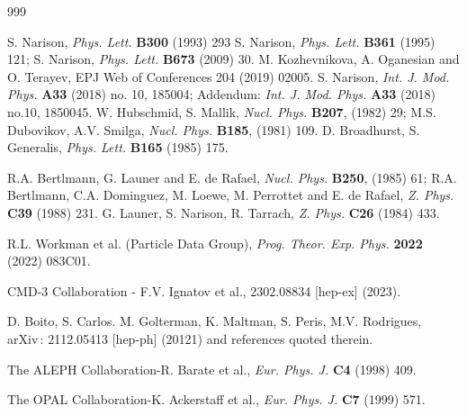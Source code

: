 \begin{thebibliography}{999}

S. Narison, {\it Phys. Lett.}  {\bf B300} (1993) 293
S. Narison, {\it Phys. Lett.}  {\bf B361} (1995) 121;
S. Narison, {\it Phys. Lett.} {\bf B673} (2009) 30.
 M. Kozhevnikova, A. Oganesian and O. Terayev, EPJ Web of Conferences 204 (2019) 02005.
  S. Narison,  {\it Int. J. Mod. Phys.} {\bf A33} (2018) no. 10, 185004; %
  Addendum: {\it Int. J. Mod. Phys.} {\bf A33} (2018) no.10, 1850045.%
 W. Hubschmid, S. Mallik, {\it Nucl. Phys.} {\bf B207}, (1982) 29;
M.S. Dubovikov, A.V. Smilga, {\it Nucl. Phys.} {\bf B185}, (1981) 109.
 D. Broadhurst, S. Generalis, {\it  Phys. Lett.} 
{\bf B165} (1985)  175.

R.A. Bertlmann, G. Launer and E. de Rafael, {\it Nucl. Phys.} {\bf B250}, (1985) 61;  R.A. Bertlmann, C.A. Dominguez, M. Loewe, M. Perrottet and E. de Rafael, {\it Z. Phys.} {\bf C39} (1988) 231.
G. Launer, S. Narison, R. Tarrach, {\it  Z. Phys.} {\bf C26}
(1984) 433.

R.L. Workman et al. (Particle Data Group), {\it Prog. Theor. Exp. Phys.}  {\bf 2022} (2022) 083C01.

CMD-3 Collaboration - F.V. Ignatov et al., 2302.08834 [hep-ex] (2023).

  D. Boito, S. Carlos. M. Golterman, K. Maltman, S. Peris, M.V. Rodrigues, arXiv\,: 2112.05413 [hep-ph] (20121) and references quoted therein.

 The ALEPH Collaboration-R. Barate et al., {\it Eur. Phys. J.} {\bf C4} (1998) 409.

 The OPAL Collaboration-K. Ackerstaff et al., {\it Eur. Phys. J.} {\bf C7} (1999) 571.


\end{thebibliography}
